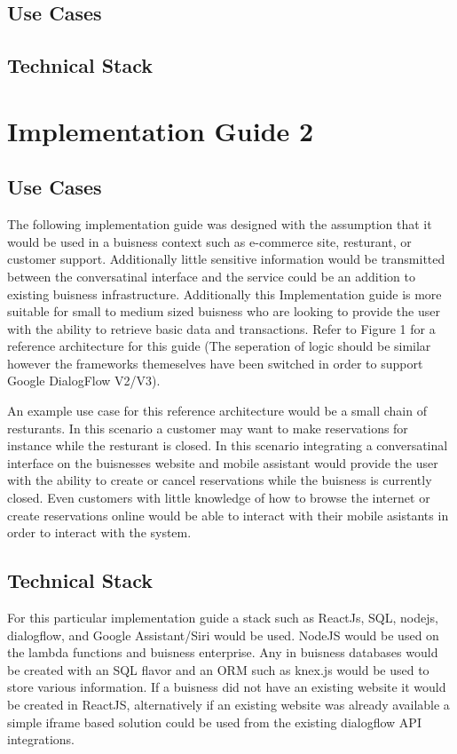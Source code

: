 \documentclass[9pt,software]{livecoms}
\begin{document}
\subsection{Use Cases}

\subsection{Technical Stack}

\section{Implementation Guide 2}

\subsection{Use Cases}
The following implementation guide was designed with the assumption that it would be used in a buisness context such as 
e-commerce site, resturant, or customer support. Additionally little sensitive information would be transmitted between the 
conversatinal interface and the service could be an addition to existing buisness infrastructure. Additionally this 
Implementation guide is more suitable for small to medium sized buisness who are looking to provide the user with 
the ability to retrieve basic data and transactions. Refer to Figure 1 for a reference architecture for this guide (The seperation of logic
should be similar however the frameworks themeselves have been switched in order to support Google DialogFlow V2/V3).

An example use case for this reference architecture would be a small chain of resturants. In this scenario a customer may
want to make reservations for instance while the resturant is closed. In this scenario integrating a conversatinal interface 
on the buisnesses website and mobile assistant would provide the user with the ability to create or cancel reservations while 
the buisness is currently closed. Even customers with little knowledge of how to browse the internet or create reservations online
would be able to interact with their mobile asistants in order to interact with the system.  

\subsection{Technical Stack}
For this particular implementation guide a stack such as ReactJs, SQL, nodejs, dialogflow, and Google Assistant/Siri would be used. NodeJS would
be used on the lambda functions and buisness enterprise. Any in buisness databases would be created with an SQL flavor and an ORM such as 
knex.js would be used to store various information. If a buisness did not have an existing website it would be created in ReactJS, alternatively 
if an existing website was already available a simple iframe based solution could be used from the existing dialogflow API integrations.
\end{document}
